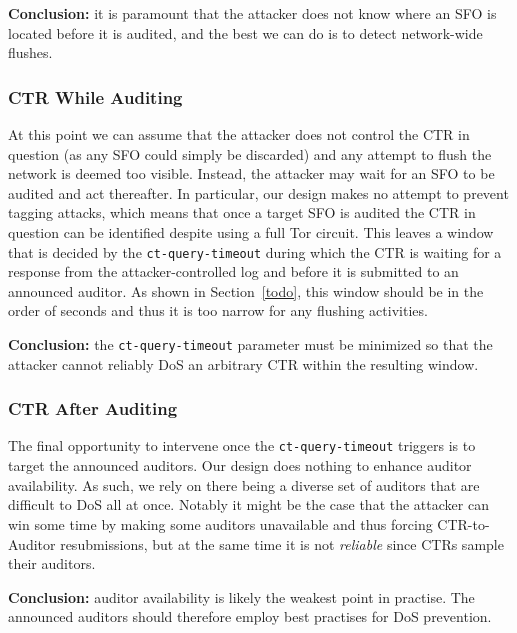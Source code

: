 \textbf{Conclusion:}
it is paramount that the attacker does not know where an SFO is located before
it is audited, and the best we can do is to detect network-wide flushes.

\subsubsection{CTR While Auditing}
At this point we can assume that the attacker does not control the CTR in
question (as any SFO could simply be discarded) and any attempt to flush the
network is deemed too visible.  Instead, the attacker may wait for an
SFO to be audited and act thereafter.  In particular, our design makes no
attempt to prevent tagging attacks, which means that once a target SFO is
audited the CTR in question can be identified despite using a full Tor circuit.
This leaves a window that is decided by the \texttt{ct-query-timeout} during
which the CTR is waiting for a response from the attacker-controlled log and
before it is submitted to an announced auditor.  As shown in Section~\ref{todo},
this window should be in the order of seconds and thus it is too narrow for any
flushing activities.

\textbf{Conclusion:}
the \texttt{ct-query-timeout} parameter must be minimized so that the attacker
cannot reliably DoS an arbitrary CTR within the resulting window.

\subsubsection{CTR After Auditing}
The final opportunity to intervene once the \texttt{ct-query-timeout} triggers
is to target the announced auditors.  Our design does nothing to enhance
auditor availability.  As such, we rely on there being a diverse set of
auditors that are difficult to DoS all at once.  Notably it might be the case
that the attacker can win some time by making some auditors unavailable and thus
forcing CTR-to-Auditor resubmissions, but at the same time it is not
\emph{reliable} since CTRs sample their auditors.

\textbf{Conclusion:}
auditor availability is likely the weakest point in practise.  The
announced auditors should therefore employ best practises for DoS prevention.

